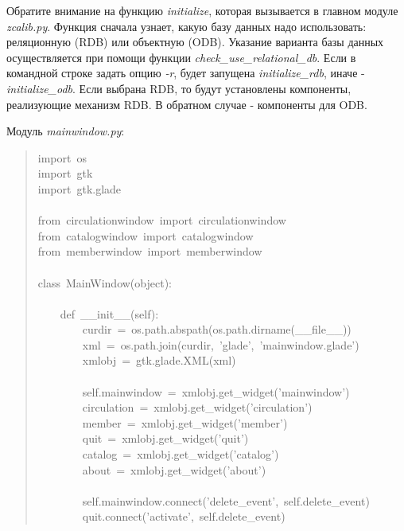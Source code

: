 \documentclass[a4paper,openany,twoside,final]{book}
\providecommand*{\DUroletitlereference}[1]{\textsl{#1}}
\begin{document}
Обратите внимание на функцию \DUroletitlereference{initialize}, которая вызывается в
главном модуле \DUroletitlereference{zcalib.py}.  Функция сначала узнает, какую базу данных
надо использовать: реляционную (RDB) или объектную (ODB).  Указание
варианта базы данных осуществляется при помощи функции
\DUroletitlereference{check\_use\_relational\_db}.  Если в командной строке задать опцию \DUroletitlereference{-r},
будет запущена \DUroletitlereference{initialize\_rdb}, иначе - \DUroletitlereference{initialize\_odb}.  Если
выбрана RDB, то будут установлены компоненты, реализующие механизм
RDB.  В обратном случае - компоненты для ODB.

Модуль \DUroletitlereference{mainwindow.py}:

\begin{quote}{\ttfamily \raggedright \noindent
import~os\\
import~gtk\\
import~gtk.glade\\
~\\
from~circulationwindow~import~circulationwindow\\
from~catalogwindow~import~catalogwindow\\
from~memberwindow~import~memberwindow\\
~\\
class~MainWindow(object):\\
~\\
~~~~def~\_\_init\_\_(self):\\
~~~~~~~~curdir~=~os.path.abspath(os.path.dirname(\_\_file\_\_))\\
~~~~~~~~xml~=~os.path.join(curdir,~'glade',~'mainwindow.glade')\\
~~~~~~~~xmlobj~=~gtk.glade.XML(xml)\\
~\\
~~~~~~~~self.mainwindow~=~xmlobj.get\_widget('mainwindow')\\
~~~~~~~~circulation~=~xmlobj.get\_widget('circulation')\\
~~~~~~~~member~=~xmlobj.get\_widget('member')\\
~~~~~~~~quit~=~xmlobj.get\_widget('quit')\\
~~~~~~~~catalog~=~xmlobj.get\_widget('catalog')\\
~~~~~~~~about~=~xmlobj.get\_widget('about')\\
~\\
~~~~~~~~self.mainwindow.connect('delete\_event',~self.delete\_event)\\
~~~~~~~~quit.connect('activate',~self.delete\_event)\\
}
\end{quote}
\end{document}
